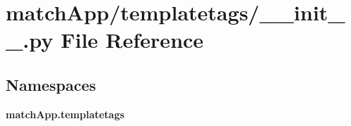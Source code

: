\section{match\+App/templatetags/\+\_\+\+\_\+init\+\_\+\+\_\+.py File Reference}
\label{match_app_2templatetags_2____init_____8py}
\subsection*{Namespaces}
\begin{DoxyCompactItemize}
\item 
 {\bf match\+App.\+templatetags}
\end{DoxyCompactItemize}
